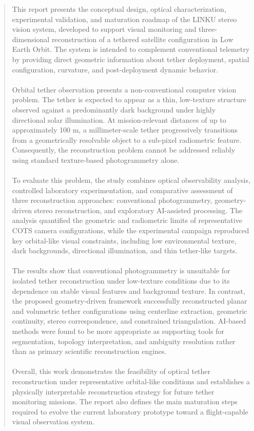 \documentclass[a4paper, twoside]{report}
\begin{document}


\begin{abstract}
This report presents the conceptual design, optical characterization, experimental validation, and maturation roadmap of the LINKU stereo vision system, developed to support visual monitoring and three-dimensional reconstruction of a tethered satellite configuration in Low Earth Orbit. The system is intended to complement conventional telemetry by providing direct geometric information about tether deployment, spatial configuration, curvature, and post-deployment dynamic behavior.
\\\\
Orbital tether observation presents a non-conventional computer vision problem. The tether is expected to appear as a thin, low-texture structure observed against a predominantly dark background under highly directional solar illumination. At mission-relevant distances of up to approximately 100 m, a millimeter-scale tether progressively transitions from a geometrically resolvable object to a sub-pixel radiometric feature. Consequently, the reconstruction problem cannot be addressed reliably using standard texture-based photogrammetry alone.
\\\\
To evaluate this problem, the study combines optical observability analysis, controlled laboratory experimentation, and comparative assessment of three reconstruction approaches: conventional photogrammetry, geometry-driven stereo reconstruction, and exploratory AI-assisted processing. The analysis quantified the geometric and radiometric limits of representative COTS camera configurations, while the experimental campaign reproduced key orbital-like visual constraints, including low environmental texture, dark backgrounds, directional illumination, and thin tether-like targets.
\\\\
The results show that conventional photogrammetry is unsuitable for isolated tether reconstruction under low-texture conditions due to its dependence on stable visual features and background texture. In contrast, the proposed geometry-driven framework successfully reconstructed planar and volumetric tether configurations using centerline extraction, geometric continuity, stereo correspondence, and constrained triangulation. AI-based methods were found to be more appropriate as supporting tools for segmentation, topology interpretation, and ambiguity resolution rather than as primary scientific reconstruction engines.
\\\\
Overall, this work demonstrates the feasibility of optical tether reconstruction under representative orbital-like conditions and establishes a physically interpretable reconstruction strategy for future tether monitoring missions. The report also defines the main maturation steps required to evolve the current laboratory prototype toward a flight-capable visual observation system.

\end{abstract}
\end{document}
